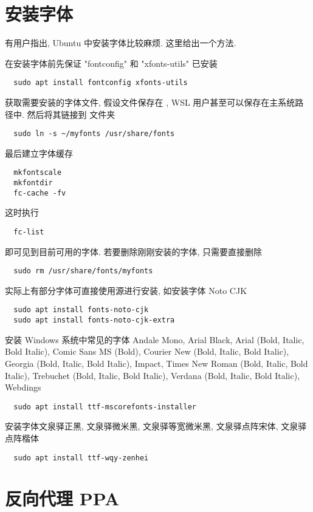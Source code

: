 \section{安装字体}\label{sec:addition:font}

有用户指出,
Ubuntu 中安装字体比较麻烦.
这里给出一个方法.

在安装字体前先保证 "fontconfig" 和 "xfonts-utils" 已安装
\begin{lstlisting}
  sudo apt install fontconfig xfonts-utils
\end{lstlisting}
获取需要安装的字体文件,
假设文件保存在 ,
WSL 用户甚至可以保存在主系统路径中.
然后将其链接到  文件夹
\begin{lstlisting}
  sudo ln -s ~/myfonts /usr/share/fonts
\end{lstlisting}
最后建立字体缓存
\begin{lstlisting}
  mkfontscale
  mkfontdir
  fc-cache -fv
\end{lstlisting}
这时执行
\begin{lstlisting}
  fc-list
\end{lstlisting}
即可见到目前可用的字体.
若要删除刚刚安装的字体,
只需要直接删除
\begin{lstlisting}
  sudo rm /usr/share/fonts/myfonts
\end{lstlisting}

实际上有部分字体可直接使用源进行安装,
如安装字体 Noto CJK
\begin{lstlisting}
  sudo apt install fonts-noto-cjk
  sudo apt install fonts-noto-cjk-extra
\end{lstlisting}
安装 Windows 系统中常见的字体 Andale Mono,
Arial Black,
Arial (Bold, Italic, Bold Italic),
Comic Sans MS (Bold),
Courier New (Bold, Italic, Bold Italic),
Georgia (Bold, Italic, Bold Italic),
Impact,
Times New Roman (Bold, Italic, Bold Italic),
Trebuchet (Bold, Italic, Bold Italic),
Verdana (Bold, Italic, Bold Italic),
Webdings
\begin{lstlisting}
  sudo apt install ttf-mscorefonts-installer
\end{lstlisting}
安装字体文泉驿正黑,
文泉驿微米黑,
文泉驿等宽微米黑,
文泉驿点阵宋体,
文泉驿点阵楷体
\begin{lstlisting}
  sudo apt install ttf-wqy-zenhei
\end{lstlisting}

\section{反向代理 PPA}\label{sec:addition:proxy}

